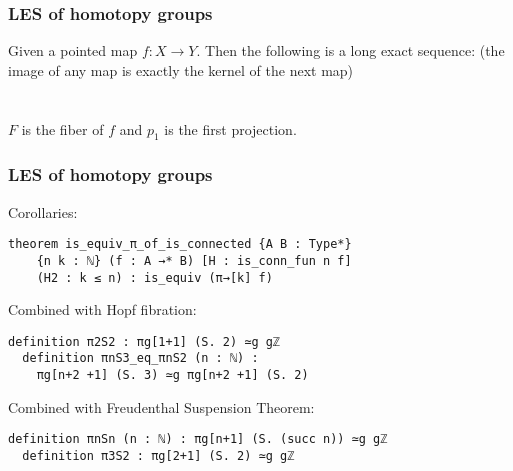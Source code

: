 \documentclass[xcolor=table]{beamer}
\newcommand{\nb}{\mbox{}\\[2pt]}
\newcommand{\nn}{\mbox{}\\ \mbox{}\\}
\begin{document}

\begin{frame}
  \frametitle{LES of homotopy groups}
  Given a pointed map $f : X \to Y$. Then the following is a long exact sequence:
  {\footnotesize (the image of any map is exactly the kernel of the next map)}\nn
      \nb
      $F$ is the fiber of $f$ and $p_1$ is the first projection.

\end{frame}


\begin{frame}[fragile]
\frametitle{LES of homotopy groups}

Corollaries:
\begin{lstlisting}[gobble=2]
  theorem is_equiv_π_of_is_connected {A B : Type*}
    {n k : ℕ} (f : A →* B) [H : is_conn_fun n f]
    (H2 : k ≤ n) : is_equiv (π→[k] f)
\end{lstlisting}

Combined with Hopf fibration:

\begin{lstlisting}[gobble=2]
  definition π2S2 : πg[1+1] (S. 2) ≃g gℤ
  definition πnS3_eq_πnS2 (n : ℕ) :
    πg[n+2 +1] (S. 3) ≃g πg[n+2 +1] (S. 2)
\end{lstlisting}

Combined with Freudenthal Suspension Theorem:

\begin{lstlisting}[gobble=2]
  definition πnSn (n : ℕ) : πg[n+1] (S. (succ n)) ≃g gℤ
  definition π3S2 : πg[2+1] (S. 2) ≃g gℤ
\end{lstlisting}

\end{frame}
\end{document}
